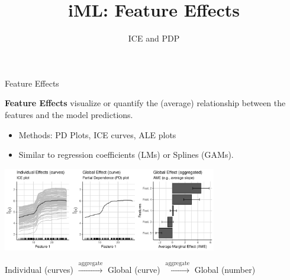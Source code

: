 \documentclass[aspectratio=169]{../latex_main/tntbeamer}  %
\title[Introduction]{iML: Feature Effects}
\subtitle{ICE and PDP}
\begin{document}
	
	\maketitle

	
\begin{frame}{Feature Effects}

\vspace{-1em}
\textbf{Feature Effects} visualize or quantify the (average) relationship between the features and the model predictions.

\begin{itemize}
    \item Methods: PD Plots, ICE curves, ALE plots
    \item Similar to regression coefficients (LMs) or Splines (GAMs).
\end{itemize}

\centerline{\includegraphics[width=0.7\textwidth]{figure/feature-effects.pdf}}

\begin{center}
    Individual (curves) $\xrightarrow[]{\text{aggregate}}$ Global (curve)  $\xrightarrow[]{\text{aggregate}}$ Global (number)
\end{center}

\end{frame}
\end{document}
